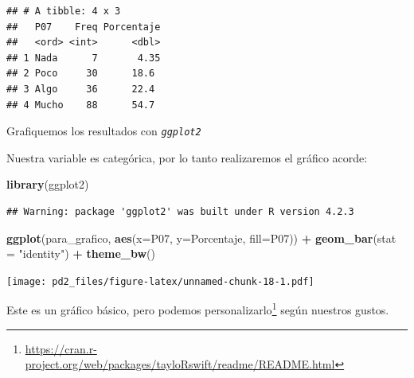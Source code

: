 \documentclass[
]{article}
\newenvironment{Shaded}{\begin{snugshade}}{\end{snugshade}}
\newcommand{\AttributeTok}[1]{\textcolor[rgb]{0.13,0.29,0.53}{#1}}
\newcommand{\FunctionTok}[1]{\textcolor[rgb]{0.13,0.29,0.53}{\textbf{#1}}}
\newcommand{\NormalTok}[1]{#1}
\newcommand{\SpecialCharTok}[1]{\textcolor[rgb]{0.81,0.36,0.00}{\textbf{#1}}}
\newcommand{\StringTok}[1]{\textcolor[rgb]{0.31,0.60,0.02}{#1}}
\begin{document}
\begin{verbatim}
## # A tibble: 4 x 3
##   P07    Freq Porcentaje
##   <ord> <int>      <dbl>
## 1 Nada      7       4.35
## 2 Poco     30      18.6 
## 3 Algo     36      22.4 
## 4 Mucho    88      54.7
\end{verbatim}

Grafiquemos los resultados con \emph{\texttt{ggplot2}}

Nuestra variable es categórica, por lo tanto realizaremos el gráfico
acorde:

\begin{Shaded}
\begin{Highlighting}[]
\FunctionTok{library}\NormalTok{(ggplot2)}
\end{Highlighting}
\end{Shaded}

\begin{verbatim}
## Warning: package 'ggplot2' was built under R version 4.2.3
\end{verbatim}

\begin{Shaded}
\begin{Highlighting}[]
\FunctionTok{ggplot}\NormalTok{(para\_grafico, }\FunctionTok{aes}\NormalTok{(}\AttributeTok{x=}\NormalTok{P07, }\AttributeTok{y=}\NormalTok{Porcentaje, }\AttributeTok{fill=}\NormalTok{P07)) }\SpecialCharTok{+} 
\FunctionTok{geom\_bar}\NormalTok{(}\AttributeTok{stat =} \StringTok{"identity"}\NormalTok{) }\SpecialCharTok{+}
  \FunctionTok{theme\_bw}\NormalTok{()}
\end{Highlighting}
\end{Shaded}

\texttt{[image: pd2\_files/figure-latex/unnamed-chunk-18-1.pdf]}

Este es un gráfico básico, pero podemos personalizarlo\footnote{\url{https://cran.r-project.org/web/packages/tayloRswift/readme/README.html}}
según nuestros gustos.
\end{document}
